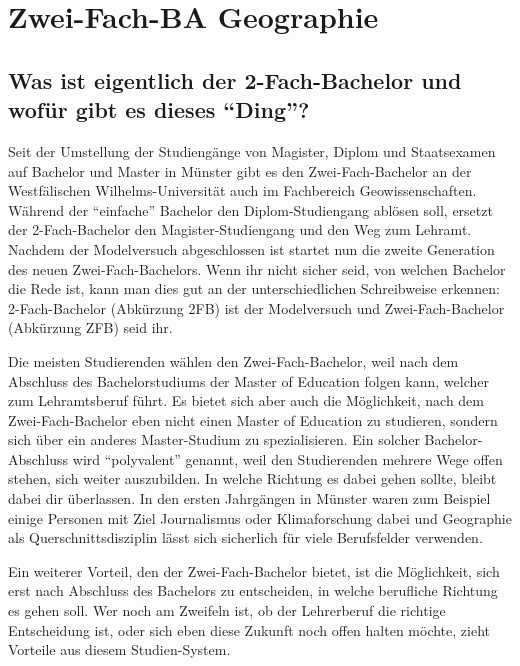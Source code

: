 \chapter{Zwei-Fach-BA Geographie}

\section*{Was ist eigentlich der 2-Fach-Bachelor und wofür gibt es dieses "`Ding"'?}
Seit der Umstellung der Studiengänge von Magister, Diplom und Staatsexamen auf Bachelor und Master in Münster gibt es den Zwei-Fach-Bachelor an der Westfälischen Wilhelms-Universität auch im Fachbereich Geowissenschaften. Während der "`einfache"' Bachelor den Diplom-Studiengang ablösen soll, ersetzt der 2-Fach-Bachelor den Magister-Studiengang und den Weg zum Lehramt. Nachdem der Modelversuch abgeschlossen ist startet nun die zweite Generation des neuen Zwei-Fach-Bachelors. Wenn ihr nicht sicher seid, von welchen Bachelor die Rede ist, kann man dies gut an der unterschiedlichen Schreibweise erkennen: 2-Fach-Bachelor (Abkürzung 2FB) ist der Modelversuch und Zwei-Fach-Bachelor (Abkürzung ZFB) seid ihr. 

Die meisten Studierenden wählen den Zwei-Fach-Bachelor, weil nach dem Abschluss des Bachelorstudiums der Master of Education folgen kann, welcher zum Lehramtsberuf führt. Es bietet sich aber auch die Möglichkeit, nach dem Zwei-Fach-Bachelor eben nicht einen Master of Education zu studieren, sondern sich über ein anderes Master-Studium zu spezialisieren. Ein solcher Bachelor-Abschluss wird "`polyvalent"' genannt, weil den Studierenden mehrere Wege offen stehen, sich weiter auszubilden. In welche Richtung es dabei gehen sollte, bleibt dabei dir überlassen. In den ersten Jahrgängen in Münster waren zum Beispiel einige Personen mit Ziel Journalismus oder Klimaforschung dabei und Geographie als Querschnittsdisziplin lässt sich sicherlich für viele Berufsfelder verwenden.

Ein weiterer Vorteil, den der Zwei-Fach-Bachelor bietet, ist die Möglichkeit, sich erst nach Abschluss des Bachelors zu entscheiden, in welche berufliche Richtung es gehen soll. Wer noch am Zweifeln ist, ob der Lehrerberuf die richtige Entscheidung ist, oder sich eben diese Zukunft noch offen halten möchte, zieht Vorteile aus diesem Studien-System.

